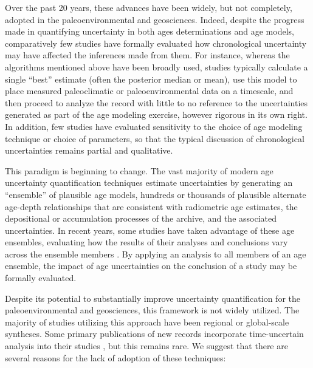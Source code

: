 \documentclass[gchron, manuscript]{copernicus}
\begin{document}
Over the past 20 years, these advances have been widely, but not
completely, adopted in the paleoenvironmental and geosciences. Indeed,
despite the progress made in quantifying uncertainty in both ages
determinations and age models, comparatively few studies have formally
evaluated how chronological uncertainty may have affected the inferences
made from them. For instance, whereas the algorithms mentioned above
have been broadly used, studies typically calculate a single ``best''
estimate (often the posterior median or mean), use this model to place
measured paleoclimatic or paleoenvironmental data on a timescale, and
then proceed to analyze the record with little to no reference to the
uncertainties generated as part of the age modeling exercise, however
rigorous in its own right. In addition, few studies have evaluated
sensitivity to the choice of age modeling technique or choice of
parameters, so that the typical discussion of chronological
uncertainties remains partial and qualitative.

This paradigm is beginning to change. The vast majority of modern age
uncertainty quantification techniques estimate uncertainties by
generating an ``ensemble'' of plausible age models, hundreds or
thousands of plausible alternate age-depth relationships that are
consistent with radiometric age estimates, the depositional or
accumulation processes of the archive, and the associated uncertainties.
In recent years, some studies have taken advantage of these age
ensembles, evaluating how the results of their analyses and conclusions
vary across the ensemble members
\citep[e.g.,][]{blaauw2007testing, parnell2008flexible, blaauw2012out, khider2014, khider2017, bhattacharya2020atlantic}.
By applying an analysis to all members of an age ensemble, the impact of
age uncertainties on the conclusion of a study may be formally
evaluated.

Despite its potential to substantially improve uncertainty
quantification for the paleoenvironmental and geosciences, this
framework is not widely utilized. The majority of studies utilizing this
approach have been regional
\citep[e.g.,][]{Tierney2013, khider2017, deininger2017coherency, mckay_onset_2018, bhattacharya2020atlantic}
or global-scale
\citep[e.g.,][]{Shakun_Nature2012, Marcott_Science2013, kaufman2020HoloceneGMST}
syntheses. Some primary publications of new records incorporate
time-uncertain analysis into their studies
\citep[e.g.,][]{khider2014, Boldt2015, falster2018millennial}, but this
remains rare. We suggest that there are several reasons for the lack of
adoption of these techniques:
\end{document}

